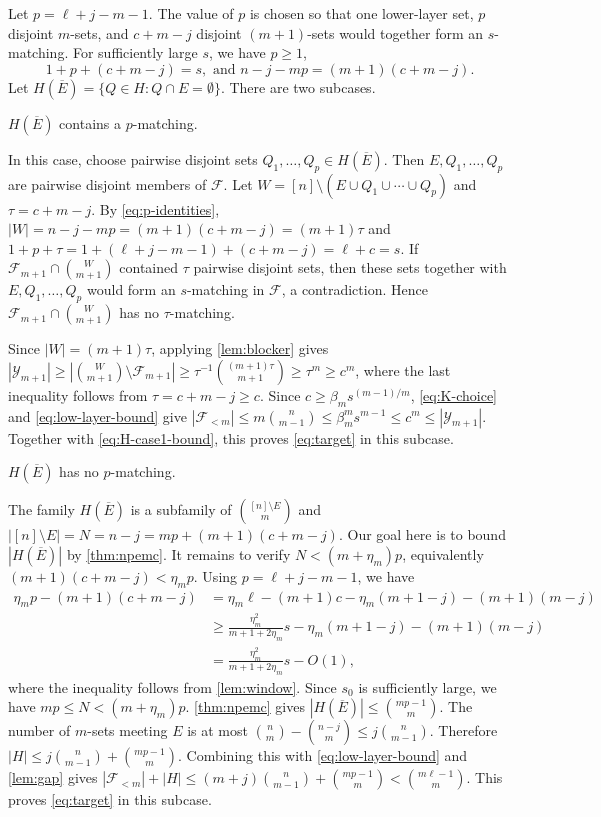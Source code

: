 \documentclass[10pt,a4paper]{article}
\numberwithin{equation}{section}
\theoremstyle{definition}
\newcommand{\F}{\mathcal F}
\newcommand{\Y}{\mathcal Y}
\begin{document}
Let $p=\ell+j-m-1$.
The value of $p$ is chosen so that one lower-layer set, $p$ disjoint $m$-sets, and $c+m-j$ disjoint $(m+1)$-sets would together form an $s$-matching.
For sufficiently large $s$, we have $p\ge1$,
\begin{equation}\label{eq:p-identities}
        1+p+(c+m-j)=s,
        \text{ and }
        n-j-mp=(m+1)(c+m-j).
\end{equation}
Let $H(\overline E)=\{Q\in H:Q\cap E=\emptyset\}$.
There are two subcases.

\medskip
{} $H(\overline E)$ contains a $p$-matching.
\medskip

In this case, choose pairwise disjoint sets $Q_1,\ldots,Q_p\in H(\overline E)$.
Then $E,Q_1,\ldots,Q_p$ are pairwise disjoint members of $\F$.
Let $W=[n]\setminus(E\cup Q_1\cup\cdots\cup Q_p)$ and $\tau=c+m-j$.
By \eqref{eq:p-identities}, $|W|=n-j-mp=(m+1)(c+m-j)=(m+1)\tau$ and $1+p+\tau=1+(\ell+j-m-1)+(c+m-j)=\ell+c=s$.
If $\F_{m+1}\cap\binom W{m+1}$ contained $\tau$ pairwise disjoint sets, then these sets together with $E,Q_1,\ldots,Q_p$ would form an $s$-matching in $\F$, a contradiction.
Hence $\F_{m+1}\cap\binom W{m+1}$ has no $\tau$-matching.

Since $|W|=(m+1)\tau$, applying \cref{lem:blocker} gives $|\Y_{m+1}|\ge\left|\binom W{m+1}\setminus \F_{m+1}\right|\ge \tau^{-1}\binom{(m+1)\tau}{m+1}\ge\tau^m\ge c^m$, where the last inequality follows from $\tau=c+m-j\ge c$.
Since $c\ge \beta_m s^{(m-1)/m}$, \eqref{eq:K-choice} and \eqref{eq:low-layer-bound} give $|\F_{<m}|\le m\binom n{m-1}\le \beta_m^m s^{m-1}\le c^m\le |\Y_{m+1}|$.
Together with \eqref{eq:H-case1-bound}, this proves \eqref{eq:target} in this subcase.

\medskip
{}$H(\overline E)$ has no $p$-matching.
\medskip

The family $H(\overline E)$ is a subfamily of $\binom{[n]\setminus E}{m}$ and $|[n]\setminus E|=N=n-j=mp+(m+1)(c+m-j)$.
Our goal here is to bound $|H(\overline E)|$ by \cref{thm:npemc}.
It remains to verify $N<(m+\eta_m)p$, equivalently $(m+1)(c+m-j)<\eta_m p$.
Using $p=\ell+j-m-1$, we have
\[
        \begin{aligned}
                \eta_m p-(m+1)(c+m-j)
                 & = \eta_m\ell-(m+1)c -\eta_m(m+1-j) -(m+1)(m-j)                \\
                 & \ge  \frac{\eta_m^2}{m+1+2\eta_m}s -\eta_m(m+1-j) -(m+1)(m-j) \\
                 & =\frac{\eta_m^2}{m+1+2\eta_m}s-O(1),
        \end{aligned}
\]
where the inequality follows from \cref{lem:window}.
Since $s_0$ is sufficiently large, we have $mp\le N<(m+\eta_m)p$.
\cref{thm:npemc} gives $|H(\overline E)|\le\binom{mp-1}{m}$.
The number of $m$-sets meeting $E$ is at most $\binom nm-\binom{n-j}m\le j\binom n{m-1}$.
Therefore $|H|\le j\binom n{m-1}+\binom{mp-1}{m}$.
Combining this with \eqref{eq:low-layer-bound} and \cref{lem:gap} gives $|\F_{<m}|+|H|\le(m+j)\binom n{m-1}+\binom{mp-1}{m}<\binom{m\ell-1}{m}$.
This proves \eqref{eq:target} in this subcase.
\end{document}
